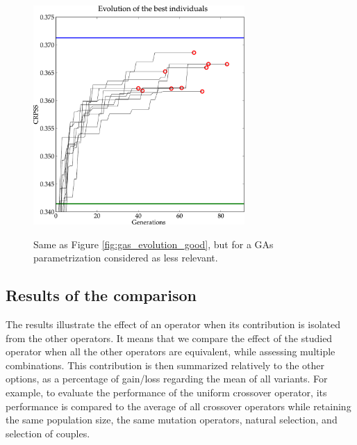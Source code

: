 \documentclass[twocol]{ametsoc}
\begin{document}
\begin{figure}[htb]
	\begin{center}
		\noindent\includegraphics[width=19pc,angle=0]{figures/gas_evolution_bad.pdf}\\
	\end{center}
	\caption{Same as Figure \ref{fig:gas_evolution_good}, but for a GAs parametrization considered as less relevant.}
	\label{fig:gas_evolution_bad}
\end{figure}



\subsection{Results of the comparison}

The results illustrate the effect of an operator when its contribution is isolated from the other operators. It means that we compare the effect of the studied operator when all the other operators are equivalent, while assessing multiple combinations. This contribution is then summarized relatively to the other options, as a percentage of gain/loss regarding the mean of all variants. For example, to evaluate the performance of the uniform crossover operator, its performance is compared to the average of all crossover operators while retaining the same population size, the same mutation operators, natural selection, and selection of couples.
\end{document}

